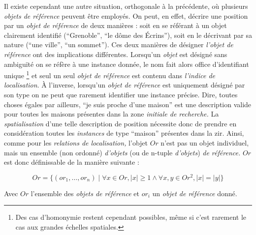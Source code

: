 Il existe cependant une autre situation, orthogonale à la précédente,
où plusieurs \emph{objets de référence} peuvent être employés. On
peut, en effet, décrire une position par un \emph{objet de référence}
de deux manières : soit en se référant à un objet clairement identifié
(\eg \enquote{Grenoble}, \enquote{le dôme des Écrins}), soit en le
décrivant par sa nature (\eg \enquote{une ville}, \enquote{un
  sommet}). Ces deux manières de désigner \emph{l'objet de référence}
ont des implications différentes. Lorsqu'un \emph{objet} est désigné
sans ambiguïté on se réfère à une instance donnée, le nom fait alors
office d'identifiant unique \footnote{Des cas d’homonymie restent
  cependant possibles, même si c'est rarement le cas aux grandes
  échelles spatiales.} et seul un seul \emph{objet de référence} est
contenu dans \emph{l'indice de localisation}. À l'inverse, lorsqu'un
\emph{objet de référence} est uniquement désigné par son type on ne
peut que rarement identifier une instance précise. Dire, toutes choses
égales par ailleurs, \enquote{je suis proche d'une maison} est une
description valide pour toutes les maisons présentes dans la zone
\emph{initiale de recherche.} La \emph{spatialisation} d'une telle
description de position nécessite donc de prendre en considération
toutes les \emph{instances} de type \enquote{maison} présentes dans la
\ac{zir}. Ainsi, comme pour les \emph{relations de localisation,}
l'objet \(Or\) n'est pas un objet individuel, mais un ensemble (non
ordonné) \emph{d'objets} (ou de n-tuple \emph{d'objets}) \emph{de
  référence.} \(Or\) est donc définissable de la manière suivante :

\begin{equation}
  Or = \{(or_1, \ldots,  or_n) \mid \forall x \in Or, |x| ≥ 1 \wedge
  \forall x,y \in Or^2, |x| = |y|\}
\end{equation}

Avec \(Or\) l'ensemble des \emph{objets de référence} et \(or_i\) un
\emph{objet de référence} donné.


